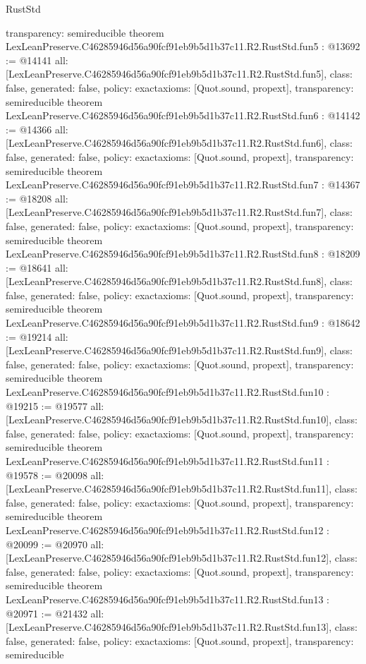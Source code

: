 \begin{lexlean}{RustStd}
\begin{coremodule}
{  transparency: semireducible
}
theorem LexLeanPreserve.C46285946d56a90fcf91eb9b5d1b37c11.R2.RustStd.fun5 : @13692 := @14141 {
  all: [LexLeanPreserve.C46285946d56a90fcf91eb9b5d1b37c11.R2.RustStd.fun5],
  class: false,
  generated: false,
  policy: exact{axioms: [Quot.sound, propext]},
  transparency: semireducible
}
theorem LexLeanPreserve.C46285946d56a90fcf91eb9b5d1b37c11.R2.RustStd.fun6 : @14142 := @14366 {
  all: [LexLeanPreserve.C46285946d56a90fcf91eb9b5d1b37c11.R2.RustStd.fun6],
  class: false,
  generated: false,
  policy: exact{axioms: [Quot.sound, propext]},
  transparency: semireducible
}
theorem LexLeanPreserve.C46285946d56a90fcf91eb9b5d1b37c11.R2.RustStd.fun7 : @14367 := @18208 {
  all: [LexLeanPreserve.C46285946d56a90fcf91eb9b5d1b37c11.R2.RustStd.fun7],
  class: false,
  generated: false,
  policy: exact{axioms: [Quot.sound, propext]},
  transparency: semireducible
}
theorem LexLeanPreserve.C46285946d56a90fcf91eb9b5d1b37c11.R2.RustStd.fun8 : @18209 := @18641 {
  all: [LexLeanPreserve.C46285946d56a90fcf91eb9b5d1b37c11.R2.RustStd.fun8],
  class: false,
  generated: false,
  policy: exact{axioms: [Quot.sound, propext]},
  transparency: semireducible
}
theorem LexLeanPreserve.C46285946d56a90fcf91eb9b5d1b37c11.R2.RustStd.fun9 : @18642 := @19214 {
  all: [LexLeanPreserve.C46285946d56a90fcf91eb9b5d1b37c11.R2.RustStd.fun9],
  class: false,
  generated: false,
  policy: exact{axioms: [Quot.sound, propext]},
  transparency: semireducible
}
theorem LexLeanPreserve.C46285946d56a90fcf91eb9b5d1b37c11.R2.RustStd.fun10 : @19215 := @19577 {
  all: [LexLeanPreserve.C46285946d56a90fcf91eb9b5d1b37c11.R2.RustStd.fun10],
  class: false,
  generated: false,
  policy: exact{axioms: [Quot.sound, propext]},
  transparency: semireducible
}
theorem LexLeanPreserve.C46285946d56a90fcf91eb9b5d1b37c11.R2.RustStd.fun11 : @19578 := @20098 {
  all: [LexLeanPreserve.C46285946d56a90fcf91eb9b5d1b37c11.R2.RustStd.fun11],
  class: false,
  generated: false,
  policy: exact{axioms: [Quot.sound, propext]},
  transparency: semireducible
}
theorem LexLeanPreserve.C46285946d56a90fcf91eb9b5d1b37c11.R2.RustStd.fun12 : @20099 := @20970 {
  all: [LexLeanPreserve.C46285946d56a90fcf91eb9b5d1b37c11.R2.RustStd.fun12],
  class: false,
  generated: false,
  policy: exact{axioms: [Quot.sound, propext]},
  transparency: semireducible
}
theorem LexLeanPreserve.C46285946d56a90fcf91eb9b5d1b37c11.R2.RustStd.fun13 : @20971 := @21432 {
  all: [LexLeanPreserve.C46285946d56a90fcf91eb9b5d1b37c11.R2.RustStd.fun13],
  class: false,
  generated: false,
  policy: exact{axioms: [Quot.sound, propext]},
  transparency: semireducible
}
\end{coremodule}
\end{lexlean}
